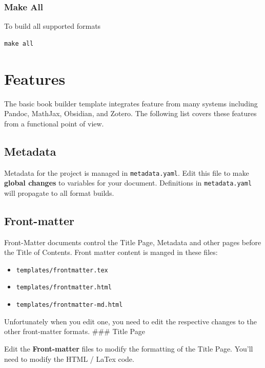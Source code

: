 \documentclass[
  12pt,
  openany]{book}
\providecommand{\tightlist}{%
  \setlength{\itemsep}{0pt}\setlength{\parskip}{0pt}}
\begin{document}
\subsection{Make All}\label{make-all}

To build all supported formats

\begin{verbatim}
make all
\end{verbatim}

\chapter{Features}\label{features}

The basic book builder template integrates feature from many systems
including Pandoc, MathJax, Obsidian, and Zotero. The following list
covers these features from a functional point of view.

\section{Metadata}\label{metadata}

Metadata for the project is managed in \texttt{metadata.yaml}. Edit this
file to make \textbf{global changes} to variables for your document.
Definitions in \texttt{metadata.yaml} will propagate to all format
builds.

\section{Front-matter}\label{front-matter}

Front-Matter documents control the Title Page, Metadata and other pages
before the Title of Contents. Front matter content is manged in these
files:

\begin{itemize}
\tightlist
\item
  \texttt{templates/frontmatter.tex}
\item
  \texttt{templates/frontmatter.html}
\item
  \texttt{templates/frontmatter-md.html}
\end{itemize}

Unfortunately when you edit one, you need to edit the respective changes
to the other front-matter formats. \#\#\# Title Page

Edit the \textbf{Front-matter} files to modify the formatting of the
Title Page. You'll need to modify the HTML / LaTex code.
\end{document}
